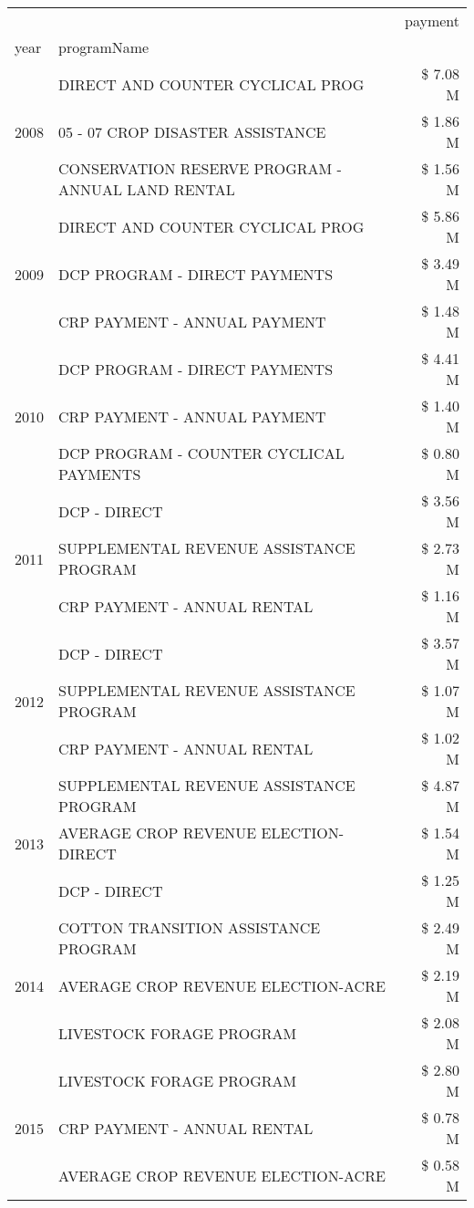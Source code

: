 \begin{tabular}{llr}
\toprule
 &  & payment \\
year & programName &  \\
\midrule
\multirow[t]{3}{*}{2008} & DIRECT AND COUNTER CYCLICAL PROG & \$ 7.08 M \\
 & 05 - 07 CROP DISASTER ASSISTANCE & \$ 1.86 M \\
 & CONSERVATION RESERVE PROGRAM - ANNUAL LAND RENTAL & \$ 1.56 M \\
\cline{1-3}
\multirow[t]{3}{*}{2009} & DIRECT AND COUNTER CYCLICAL PROG & \$ 5.86 M \\
 & DCP PROGRAM - DIRECT PAYMENTS & \$ 3.49 M \\
 & CRP PAYMENT - ANNUAL PAYMENT & \$ 1.48 M \\
\cline{1-3}
\multirow[t]{3}{*}{2010} & DCP PROGRAM - DIRECT PAYMENTS & \$ 4.41 M \\
 & CRP PAYMENT - ANNUAL PAYMENT & \$ 1.40 M \\
 & DCP PROGRAM - COUNTER CYCLICAL PAYMENTS & \$ 0.80 M \\
\cline{1-3}
\multirow[t]{3}{*}{2011} & DCP - DIRECT & \$ 3.56 M \\
 & SUPPLEMENTAL REVENUE ASSISTANCE PROGRAM & \$ 2.73 M \\
 & CRP PAYMENT - ANNUAL RENTAL & \$ 1.16 M \\
\cline{1-3}
\multirow[t]{3}{*}{2012} & DCP - DIRECT & \$ 3.57 M \\
 & SUPPLEMENTAL REVENUE ASSISTANCE PROGRAM & \$ 1.07 M \\
 & CRP PAYMENT - ANNUAL RENTAL & \$ 1.02 M \\
\cline{1-3}
\multirow[t]{3}{*}{2013} & SUPPLEMENTAL REVENUE ASSISTANCE PROGRAM & \$ 4.87 M \\
 & AVERAGE CROP REVENUE ELECTION-DIRECT & \$ 1.54 M \\
 & DCP - DIRECT & \$ 1.25 M \\
\cline{1-3}
\multirow[t]{3}{*}{2014} & COTTON TRANSITION ASSISTANCE PROGRAM & \$ 2.49 M \\
 & AVERAGE CROP REVENUE ELECTION-ACRE & \$ 2.19 M \\
 & LIVESTOCK FORAGE PROGRAM & \$ 2.08 M \\
\cline{1-3}
\multirow[t]{3}{*}{2015} & LIVESTOCK FORAGE PROGRAM & \$ 2.80 M \\
 & CRP PAYMENT - ANNUAL RENTAL & \$ 0.78 M \\
 & AVERAGE CROP REVENUE ELECTION-ACRE & \$ 0.58 M \\

\end{tabular}
